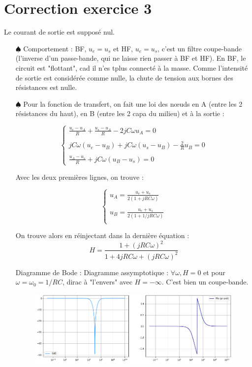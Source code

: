 \documentclass{report}
\begin{document}
\section*{Correction exercice 3}

Le courant de sortie est supposé nul.

\begin{itemize}
	\item[$\spadesuit$] Comportement : BF, $u_e=u_s$ et HF, $u_e=u_s$, c'est un filtre coupe-bande (l'inverse d'un passe-bande, qui ne laisse rien passer à BF et HF). En BF, le circuit est "flottant", cad il n'es tplus connecté à la masse. Comme l'intensité de sortie est considérée comme nulle, la chute de tension aux bornes des résistances est nulle.
	
	\item[$\spadesuit$]
		Pour la fonction de transfert, on fait une loi des nœuds en A (entre les 2 résistances du haut), en B (entre les 2 capa du milieu) et à la sortie :
		
\begin{equation}
	\left\lbrace
	\begin{array}{lll}
		 \frac{u_e-u_A}{R} + \frac{u_s-u_A}{R} -2jC\omega u_A = 0\\
		 \\
		 jC\omega(u_e-u_B) +  jC\omega(u_s-u_B) - \frac{2}{R}u_B =0  \\
		 \\
		 \frac{u_A-u_s}{R} + jC\omega(u_B-u_s)=0
	\end{array}\right.
\end{equation}

Avec les deux premières lignes, on trouve :

\begin{equation}
	\left\lbrace
	\begin{array}{lll}
		 u_A = \frac{u_e+u_s}{2(1+jRC\omega)}\\
		 \\
		 u_B = \frac{u_e+u_s}{2(1+1/jRC\omega)} \\
	\end{array}\right.
\end{equation}

	On trouve alors en réinjectant dans la dernière équation :
	\begin{equation}
		H =\frac{1+(jRC\omega)^2}{1+4jRC\omega + (jRC\omega)^2}
	\end{equation}
	
	Diagramme de Bode :
Diagramme assymptotique :  $\forall \omega, H=0$ et pour $\omega=\omega_0=1/RC$, dirac à "l'envers" avec $H=-\infty$. C'est bien un coupe-bande.
\begin{figure}[!h]
	\centering
	\includegraphics[width=0.8\linewidth]{exo3_0.png}
\end{figure}



\end{itemize}
\end{document}

